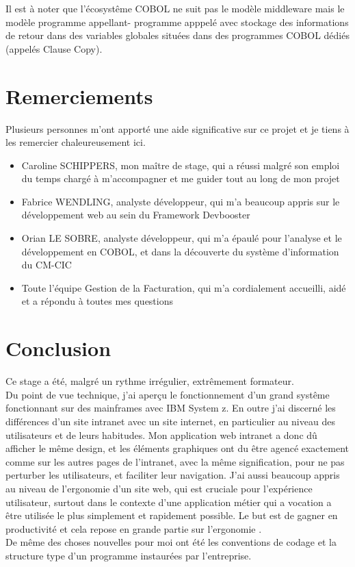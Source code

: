 \documentclass[a4paper,french,12pt]{article}
\begin{document}
			Il est à noter que l'écosystême COBOL ne suit pas le modèle middleware mais le modèle programme appellant- programme apppelé avec stockage des informations de retour dans des variables globales situées dans
			des programmes COBOL dédiés (appelés Clause Copy).

			
\section{Remerciements}

	Plusieurs personnes m’ont apporté une aide significative sur ce projet et je tiens à les remercier chaleureusement ici. 

	\begin{itemize}
		\item Caroline \textsc{SCHIPPERS}, mon maître de stage, qui a réussi malgré son emploi du temps chargé à m’accompagner et me guider tout au long de mon projet
		\item Fabrice \textsc{WENDLING}, analyste développeur, qui m’a beaucoup appris sur le développement web au sein du Framework Devbooster
		\item Orian \textsc{LE SOBRE}, analyste développeur, qui m’a épaulé pour l’analyse et le développement en COBOL, et dans la découverte du système d’information du CM-CIC
		\item Toute l’équipe Gestion de la Facturation, qui m’a cordialement accueilli, aidé et a répondu à toutes mes questions
	\end{itemize}

  
  
\section{Conclusion}


		Ce stage a été, malgré un rythme irrégulier, extrêmement formateur. \\
		
		
		Du point de vue technique, j'ai aperçu le fonctionnement d'un grand systême fonctionnant sur des mainframes avec IBM System z. 
		En outre j'ai discerné les différences d'un site intranet avec un site internet, en particulier au niveau des utilisateurs et de leurs habitudes. Mon application web intranet a donc dû afficher 
		le même design, et les éléments graphiques ont du être agencé exactement comme sur les autres pages de l'intranet, avec la même signification, pour ne pas perturber les utilisateurs, et faciliter leur navigation.
		J'ai aussi beaucoup appris au niveau de l'ergonomie d'un site web, qui est cruciale pour l'expérience utilisateur, surtout dans le contexte d'une application métier qui a vocation a être utilisée
		le plus simplement et rapidement possible. Le but est de gagner en productivité et cela repose en grande partie sur l'ergonomie .\\
		De même des choses nouvelles pour moi ont été les conventions de codage et la structure type d'un programme instaurées par l'entreprise.
		
\end{document}
